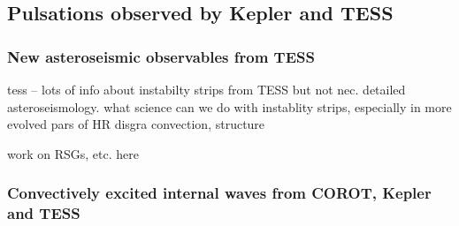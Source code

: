 {\color{blue}
\subsection{Pulsations observed by Kepler and TESS}



\subsubsection{New asteroseismic observables from TESS}

tess -- lots of info about instabilty strips from TESS but not nec. detailed asteroseismology.  what science can we do with instablity strips, especially in more evolved pars of HR disgra  convection, structure

work on RSGs, etc. here

\subsubsection{Convectively excited internal waves from COROT, Kepler and TESS}


}
